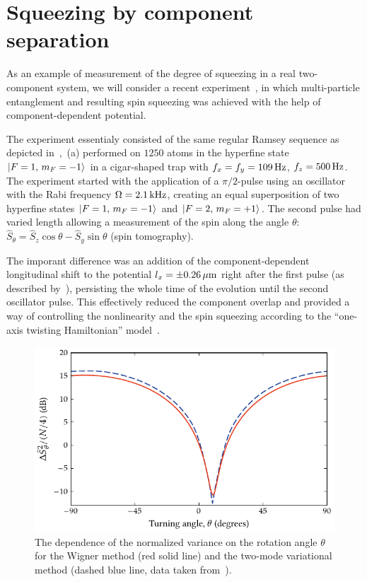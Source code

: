 \section{Squeezing by component separation}

As an example of measurement of the degree of squeezing in a real two-component  system, we will consider a recent experiment~\cite{Riedel2010}, in which multi-particle entanglement and resulting spin squeezing was achieved with the help of component-dependent potential.

The experiment essentialy consisted of the same regular Ramsey sequence as depicted in~,~(a) performed on $1250$ \Rb{} atoms in the hyperfine state ${\mbox{\ensuremath{\vert F=1,\, m_F=-1 \rangle}}}$ in a cigar-shaped trap with $f_x = f_y = 109\mbox{\ensuremath{\,\mathrm{Hz}}}$, $f_z = 500\mbox{\ensuremath{\,\mathrm{Hz}}}$.
The experiment started with the application of a $\pi/2$-pulse using an oscillator with the Rabi frequency $\Omega=2.1\mbox{\ensuremath{\,\mathrm{kHz}}}$, creating an equal superposition of two hyperfine states ${\mbox{\ensuremath{\vert F=1,\, m_F=-1 \rangle}}}$ and ${\mbox{\ensuremath{\vert F=2,\, m_F=+1 \rangle}}}$.
The second pulse had varied length allowing a measurement of the spin along the angle $\theta$: $\hat{S}_\theta = \hat{S}_z \cos \theta - \hat{S}_y \sin \theta$ (spin tomography).

The imporant difference was an addition of the component-dependent longitudinal shift to the potential $l_x = \pm 0.26\mbox{\ensuremath{\,\mathrm{\mu m}}}$ right after the first pulse (as described by~), persisting the whole time of the evolution until the second oscillator pulse.
This effectively reduced the component overlap and provided a way of controlling the nonlinearity and the spin squeezing according to the ``one-axis twisting Hamiltonian'' model~\cite{Kitagawa1993}.

\begin{figure}
    \centerline{\includegraphics{figures_generated/bec_squeezing/riedel_rotation.pdf}}

    \caption{
    The dependence of the normalized variance on the rotation angle $\theta$ for the Wigner method (red solid line) and the two-mode variational method (dashed blue line, data taken from~\cite{Riedel2010}).
    }
    \label{fig:bec-squeezing:separation:tomography}
\end{figure}

